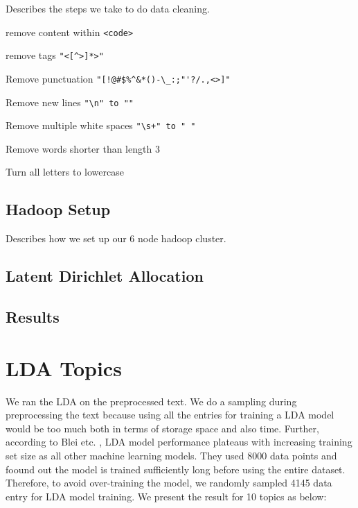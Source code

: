 \documentclass{article}
\begin{document}
Describes the steps we take to do data cleaning.

remove content within \verb+<code>+

remove tags \verb+"<[^>]*>"+

Remove punctuation \verb+"[!@#$%^&*()-\_:;"'?/.,<>]"+

Remove new lines \verb+"\n" to ""+

Remove multiple white spaces \verb-"\s+" to " "-

Remove words shorter than length 3

Turn all letters to lowercase
\subsection{Hadoop Setup}

Describes how we set up our 6 node hadoop cluster.

\subsection{Latent Dirichlet Allocation}

\subsection{Results}

\section{LDA Topics}

We ran the LDA on the preprocessed text. We do a sampling during preprocessing the text because using all the entries for training a LDA model would be too much both in terms of storage space and also time. Further, according to Blei etc. \cite{blei2003latent}, LDA model performance plateaus with increasing training set size as all other machine learning models. They used 8000 data points and foound out the model is trained sufficiently long before using the entire dataset. Therefore, to avoid over-training the model, we randomly sampled 4145 data entry for LDA model training. We present the result for 10 topics as below:
\end{document}
